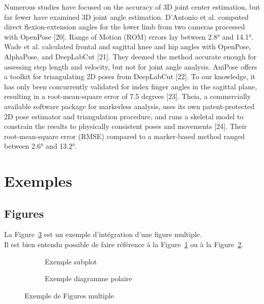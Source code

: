 Numerous studies have focused on the accuracy of 3D joint center estimation, but far fewer have examined 3D joint angle estimation. D’Antonio et al. computed direct flexion-extension angles for the lower limb from two cameras processed with OpenPose [20]. Range of Motion (ROM) errors lay between 2.8° and 14.1°. Wade et al. calculated frontal and sagittal knee and hip angles with OpenPose, AlphaPose, and DeepLabCut [21]. They deemed the method accurate enough for assessing step length and velocity, but not for joint angle analysis. AniPose offers a toolkit for triangulating 2D poses from DeepLabCut [22]. To our knowledge, it has only been concurrently validated for index finger angles in the sagittal plane, resulting in a root-mean-square error of 7.5 degrees [23]. Theia, a commercially available software package for markerless analysis, uses its own patent-protected 2D pose estimator and triangulation procedure, and runs a skeletal model to constrain the results to physically consistent poses and movements [24]. Their root-mean-square error (RMSE) compared to a marker-based method ranged between 2.6° and 13.2°.


\section{Exemples}

\FloatBarrier
\subsection{Figures}

La Figure~\ref{figure_multiple} est un exemple d'intégration d'une figure multiple. \\
Il est bien entendu possible de faire référence à la Figure~\ref{figure_subplot} ou à la Figure~\ref{figure_polaire}.

\begin{figure}[hbtp]
	\centering
	\begin{subfigure}[b]{0.8\textwidth}
		\centering
		\def\svgwidth{\columnwidth}
		\fontsize{10pt}{10pt}\selectfont
		\caption{Exemple subplot} 
		\label{figure_subplot}
	\end{subfigure}
	\qquad
	\begin{subfigure}[b]{0.7\textwidth}
		\centering
		\def\svgwidth{\columnwidth}
		\fontsize{10pt}{10pt}\selectfont
		\caption{Exemple diagramme polaire} 
		\label{figure_polaire}
	\end{subfigure}
	\caption{Exemple de Figures multiple} 
	\label{figure_multiple}
\end{figure}



